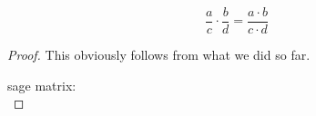 %




\begin{theorem} 
    \leanok

$$
\frac{a}{c} \cdot \frac{b}{d} = \frac{a \cdot b}{c \cdot d}
$$

\end{theorem}
    

\begin{proof}
\leanok
This obviously follows from what we did so far.


sage matrix:
$$
$$
\end{proof}